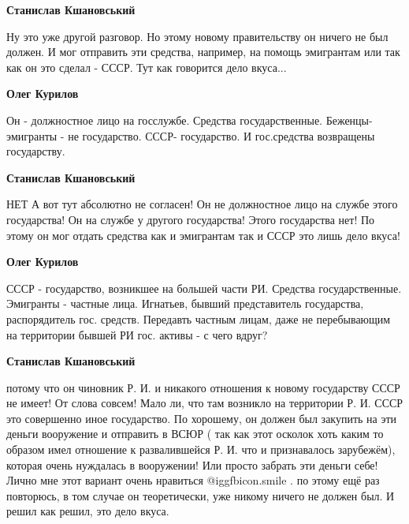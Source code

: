 \begin{itemize}
\begin{itemize}
\begin{itemize}
\textbf{Станислав Кшановський} 

Ну это уже другой разговор. Но этому новому правительству он ничего не был
должен. И мог отправить эти средства, например, на помощь эмигрантам или так
как он это сделал - СССР. Тут как говорится дело вкуса...

\textbf{Олег Курилов} 

Он - должностное лицо на госслужбе. Средства государственные. Беженцы-
эмигранты - не государство. СССР- государство. И гос.средства возвращены
государству.

\textbf{Станислав Кшановський} 

НЕТ А вот тут абсолютно не согласен! Он не должностное лицо на службе этого
государства! Он на службе у другого государства! Этого государства нет! По
этому он мог отдать средства как и эмигрантам так и СССР это лишь дело вкуса!

\textbf{Олег Курилов} 

СССР - государство, возникшее на большей части РИ. Средства
государственные. Эмигранты - частные лица. Игнатьев, бывший представитель
государства, распорядитель гос. средств. Передавть частным лицам, даже не
перебывающим на территории бывшей РИ гос. активы - с чего вдруг?


\textbf{Станислав Кшановський} 

потому что он чиновник Р. И. и никакого отношения к новому государству СССР не
имеет! От слова совсем! Мало ли, что там возникло на территории Р. И. СССР это
совершенно иное государство. По хорошему, он должен был закупить на эти деньги
вооружение и отправить в ВСЮР ( так как этот осколок хоть каким то образом имел
отношение к развалившейся Р. И. что и признавалось зарубежём), которая очень
нуждалась в вооружении! Или просто забрать эти деньги себе! Лично мне этот
вариант очень нравиться  @igg{fbicon.smile} . по этому ещё раз повторюсь, в том случае он
теоретически, уже никому ничего не должен был. И решил как решил, это дело
вкуса.

\end{itemize} %

\end{itemize} %

\end{itemize} %
